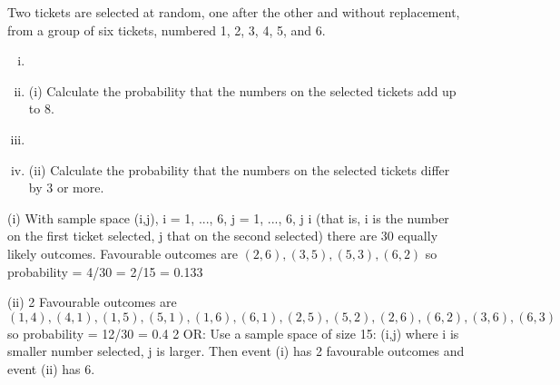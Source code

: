 \documentclass[a4paper,12pt]{article}
\begin{document}
Two tickets are selected at random, one after the other and without replacement, from a group of six tickets, numbered 1, 2, 3, 4, 5, and 6.
\begin{enumerate}[(i)]
\item \item (i) Calculate the probability that the numbers on the selected tickets add up to 8.
\item 
\item (ii) Calculate the probability that the numbers on the selected tickets differ by
3 or more.
\end{enumerate}
\item (i)
With sample space {(i,j), i = 1, ..., 6, j = 1, ..., 6, j
i}
(that is, i is the number on the first ticket selected, j that on the second
selected) there are 30 equally likely outcomes.
Favourable outcomes are $(2,6), (3,5), (5,3), (6,2)$
so probability = 4/30 = 2/15 = 0.133
\item (ii)
2
Favourable outcomes are
\[(1,4), (4,1), (1,5), (5,1), (1,6), (6,1), (2,5), (5,2), (2,6), (6,2), (3,6), (6,3)\]
so probability = 12/30 = 0.4
2
OR: Use a sample space of size 15: {(i,j)} where i is smaller number selected,
j is larger.
Then event (i) has 2 favourable outcomes and event (ii) has 6.
\end{document}
